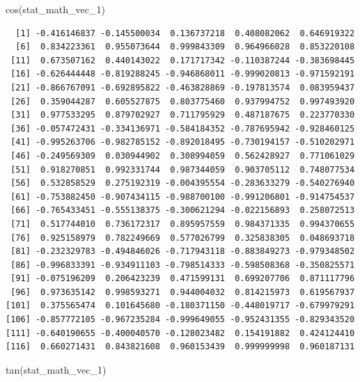 \documentclass[
  letterpaper,
  DIV=11,
  numbers=noendperiod]{scrreprt}
\newenvironment{Shaded}{\begin{snugshade}}{\end{snugshade}}
\newcommand{\FunctionTok}[1]{\textcolor[rgb]{0.28,0.35,0.67}{#1}}
\newcommand{\NormalTok}[1]{\textcolor[rgb]{0.00,0.23,0.31}{#1}}
\begin{document}
\begin{Shaded}
\begin{Highlighting}[]
\FunctionTok{cos}\NormalTok{(stat\_math\_vec\_1)}
\end{Highlighting}
\end{Shaded}

\begin{verbatim}
  [1] -0.416146837 -0.145500034  0.136737218  0.408082062  0.646919322
  [6]  0.834223361  0.955073644  0.999843309  0.964966028  0.853220108
 [11]  0.673507162  0.440143022  0.171717342 -0.110387244 -0.383698445
 [16] -0.626444448 -0.819288245 -0.946868011 -0.999020813 -0.971592191
 [21] -0.866767091 -0.692895822 -0.463828869 -0.197813574  0.083959437
 [26]  0.359044287  0.605527875  0.803775460  0.937994752  0.997493920
 [31]  0.977533295  0.879702927  0.711795929  0.487187675  0.223770330
 [36] -0.057472431 -0.334136971 -0.584184352 -0.787695942 -0.928460125
 [41] -0.995263706 -0.982785152 -0.892018495 -0.730194157 -0.510202971
 [46] -0.249569309  0.030944902  0.308994059  0.562428927  0.771061029
 [51]  0.918270851  0.992331744  0.987344059  0.903705112  0.748077534
 [56]  0.532858529  0.275192319 -0.004395554 -0.283633279 -0.540276940
 [61] -0.753882450 -0.907434115 -0.988700100 -0.991206801 -0.914754537
 [66] -0.765433451 -0.555138375 -0.300621294 -0.022156893  0.258072513
 [71]  0.517744010  0.736172317  0.895957559  0.984371335  0.994370655
 [76]  0.925158979  0.782249669  0.577026799  0.325838305  0.048693718
 [81] -0.232329783 -0.494846026 -0.717943118 -0.883849273 -0.979348502
 [86] -0.996833391 -0.934911103 -0.798514333 -0.598508368 -0.350825571
 [91] -0.075196209  0.206423239  0.471599131  0.699207706  0.871117796
 [96]  0.973635142  0.998593271  0.944004032  0.814215973  0.619567937
[101]  0.375565474  0.101645680 -0.180371150 -0.448019717 -0.679979291
[106] -0.857772105 -0.967235284 -0.999649055 -0.952431355 -0.829343520
[111] -0.640190655 -0.400040570 -0.128023482  0.154191882  0.424124410
[116]  0.660271431  0.843821608  0.960153439  0.999999998  0.960187131
\end{verbatim}

\begin{Shaded}
\begin{Highlighting}[]
\FunctionTok{tan}\NormalTok{(stat\_math\_vec\_1)}
\end{Highlighting}
\end{Shaded}
\end{document}
